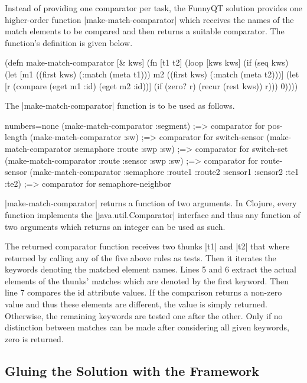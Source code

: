 \documentclass[submission]{eptcs}
\newcommand{\code}{\clojureinline}
\begin{document}
Instead of providing one comparator per task, the FunnyQT solution provides one
higher-order function \code|make-match-comparator| which receives the names of
the match elements to be compared and then returns a suitable comparator.  The
function's definition is given below.

\begin{clojurecode}
(defn make-match-comparator [& kws]
  (fn [t1 t2]
    (loop [kws kws]
      (if (seq kws)
        (let [m1 ((first kws) (:match (meta t1)))
              m2 ((first kws) (:match (meta t2)))]
          (let [r (compare (eget m1 :id) (eget m2 :id))]
            (if (zero? r)
              (recur (rest kws))
              r)))
        0))))
\end{clojurecode}

The \code|make-match-comparator| function is to be used as follows.

\begin{clojurecode*}{numbers=none}
(make-match-comparator :segment)
;=> comparator for pos-length
(make-match-comparator :sw)
;=> comparator for switch-sensor
(make-match-comparator :semaphore :route :swp :sw)
;=> comparator for switch-set
(make-match-comparator :route :sensor :swp :sw)
;=> comparator for route-sensor
(make-match-comparator :semaphore :route1 :route2 :sensor1 :sensor2 :te1 :te2)
;=> comparator for semaphore-neighbor
\end{clojurecode*}


\code|make-match-comparator| returns a function of two arguments.  In Clojure,
every function implements the \code|java.util.Comparator| interface and thus
any function of two arguments which returns an integer can be used as such.

The returned comparator function receives two thunks \code|t1| and \code|t2|
that where returned by calling any of the five above rules as tests.  Then it
iterates the keywords denoting the matched element names.  Lines 5 and 6
extract the actual elements of the thunks' matches which are denoted by the
first keyword.  Then line 7 compares the \textsf{id} attribute values.  If the
comparison returns a non-zero value and thus these elements are different, the
value is simply returned.  Otherwise, the remaining keywords are tested one
after the other.  Only if no distinction between matches can be made after
considering all given keywords, zero is returned.



\subsection{Gluing the Solution with the Framework}
\label{sec:gluing}
\end{document}
